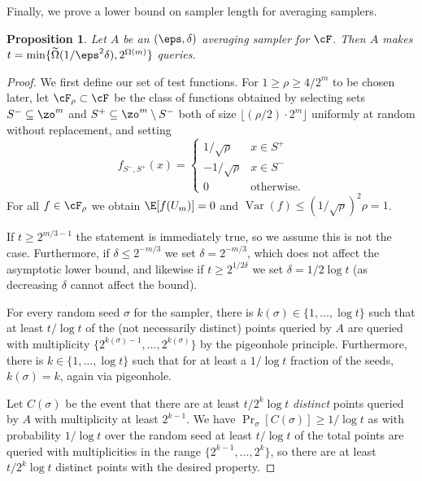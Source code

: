 \documentclass[11pt]{article}
\newtheorem{proposition}[theorem]{Proposition}
\begin{document}
Finally, we prove a lower bound on sampler length for averaging samplers. %
\begin{proposition}
Let $A$ be an $(\eps,\delta)$ averaging sampler for $\cF$. Then $A$ makes $t=\min\{\widetilde{\Omega}(1/\eps^2\delta),2^{\Omega(m)}\}$ queries.
\end{proposition}
\begin{proof}
We first define our set of test functions. For $1\geq \rho\geq 4/2^{m}$ to be chosen later, let $\cF_\rho\subset \cF$ be the class of functions obtained by selecting sets $S^-\subseteq \zo^m$ and $S^+\subseteq \zo^m\setminus S^-$ both of size $\lfloor (\rho/2)\cdot 2^m\rfloor$ uniformly at random without replacement, and setting
\[f_{S^-,S^+}(x) = \begin{cases}
1/\sqrt{\rho} & x\in S^+\\
-1/\sqrt{\rho} & x \in S^-\\
0 & \text{otherwise.}\end{cases}\]
For all $f\in \cF_\rho$ we obtain $\E[f(U_m)]=0$ and $\operatorname{Var}(f) \leq  (1/\sqrt{\rho})^2\rho=1$.


If $t\geq 2^{m/3-1}$ the statement is immediately true, so we assume this is not the case. Furthermore, if $\delta \leq 2^{-m/3}$ we set $\delta=2^{-m/3}$, which does not affect the asymptotic lower bound, and likewise if $t\geq 2^{1/2\delta}$ we set $\delta=1/2\log t$ (as decreasing $\delta$ cannot affect the bound).

For every random seed $\sigma$ for the sampler, there is $k(\sigma)\in \{1,\ldots,\log t\}$ such that at least $t/\log t$ of the (not necessarily distinct) points queried by $A$ are queried with multiplicity $\{2^{k(\sigma)-1},\ldots,2^{k(\sigma)}\}$ by the pigeonhole principle. Furthermore, there is $k\in \{1,\ldots,\log t\}$ such that for at least a $1/\log t$ fraction of the seeds, $k(\sigma)=k$, again via pigeonhole. 

Let $C(\sigma)$ be the event that there are at least $t/2^k\log t$ \textit{distinct} points queried by $A$ with multiplicity at least $2^{k-1}$. We have $\Pr_\sigma[C(\sigma)]\geq 1/\log t$ as with probability $1/\log t$ over the random seed at least $t/\log t$ of the total points are queried with multiplicities in the range $\{2^{k-1},\ldots,2^k\}$, so there are at least $t/2^{k}\log t$ distinct points with the desired property.


\end{proof}
\end{document}
